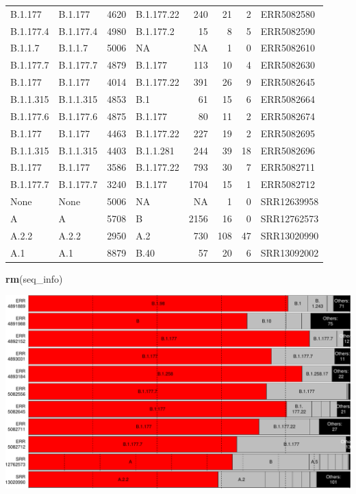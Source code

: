 \documentclass[
]{article}
\newenvironment{Shaded}{\begin{snugshade}}{\end{snugshade}}
\newcommand{\KeywordTok}[1]{\textcolor[rgb]{0.13,0.29,0.53}{\textbf{#1}}}
\newcommand{\NormalTok}[1]{#1}
\begin{document}
\begin{longtable}[]{@{}llrlrrrl@{}}
B.1.177 & B.1.177 & 4620 & B.1.177.22 & 240 & 21 & 2 &
ERR5082580\tabularnewline
B.1.177.4 & B.1.177.4 & 4980 & B.1.177.2 & 15 & 8 & 5 &
ERR5082590\tabularnewline
B.1.1.7 & B.1.1.7 & 5006 & NA & NA & 1 & 0 & ERR5082610\tabularnewline
B.1.177.7 & B.1.177.7 & 4879 & B.1.177 & 113 & 10 & 4 &
ERR5082630\tabularnewline
B.1.177 & B.1.177 & 4014 & B.1.177.22 & 391 & 26 & 9 &
ERR5082645\tabularnewline
B.1.1.315 & B.1.1.315 & 4853 & B.1 & 61 & 15 & 6 &
ERR5082664\tabularnewline
B.1.177.6 & B.1.177.6 & 4875 & B.1.177 & 80 & 11 & 2 &
ERR5082674\tabularnewline
B.1.177 & B.1.177 & 4463 & B.1.177.22 & 227 & 19 & 2 &
ERR5082695\tabularnewline
B.1.1.315 & B.1.1.315 & 4403 & B.1.1.281 & 244 & 39 & 18 &
ERR5082696\tabularnewline
B.1.177 & B.1.177 & 3586 & B.1.177.22 & 793 & 30 & 7 &
ERR5082711\tabularnewline
B.1.177.7 & B.1.177.7 & 3240 & B.1.177 & 1704 & 15 & 1 &
ERR5082712\tabularnewline
None & None & 5006 & NA & NA & 1 & 0 & SRR12639958\tabularnewline
A & A & 5708 & B & 2156 & 16 & 0 & SRR12762573\tabularnewline
A.2.2 & A.2.2 & 2950 & A.2 & 730 & 108 & 47 & SRR13020990\tabularnewline
A.1 & A.1 & 8879 & B.40 & 57 & 20 & 6 & SRR13092002\tabularnewline
\bottomrule
\end{longtable}

\begin{Shaded}
\begin{Highlighting}[]
\KeywordTok{rm}\NormalTok{(seq\_info)}
\end{Highlighting}
\end{Shaded}

\includegraphics{pangolin_results_report_files/figure-latex/pareto-1.pdf}
\end{document}
